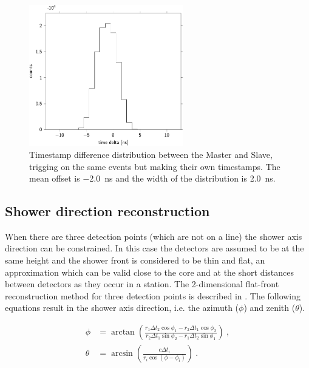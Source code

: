 \begin{figure}
    \centering
    \includegraphics[width=0.6\textwidth]
                    {plots/station/time_delta_501}
    \caption{Timestamp difference distribution between the Master and Slave, trigging on the same events but making their own timestamps. The mean offset is \SI{-2.0}{\ns} and the width of the distribution is \SI{2.0}{\ns}.}
    \label{fig:time_delta_501}
\end{figure}


\subsection{Shower direction reconstruction}

When there are three detection points (which are not on a line) the shower axis direction can be constrained. In this case the detectors are assumed to be at the same height and the shower front is considered to be thin and flat, an approximation which can be valid close to the core and at the short distances between detectors as they occur in a station. The 2-dimensional flat-front reconstruction method for three detection points is described in \cite{fokkema2012hisparc}. The following equations result in the shower axis direction, i.e. the azimuth ($\phi$) and zenith ($\theta$).

\begin{equation}
    \label{eq:direction-2dflat}
    \begin{split}
        \phi &= \arctan \left(\frac{r_1 \Delta t_2 \cos \phi_1 - r_2 \Delta t_1 \cos \phi_2}{r_2 \Delta t_1 \sin \phi_2 - r_1 \Delta t_2 \sin \phi_1} \right) \ , \\
        \theta &= \arcsin \left(\frac{c \Delta t_i}{r_i \cos(\phi - \phi_i)} \right) \ .
    \end{split}
\end{equation}

